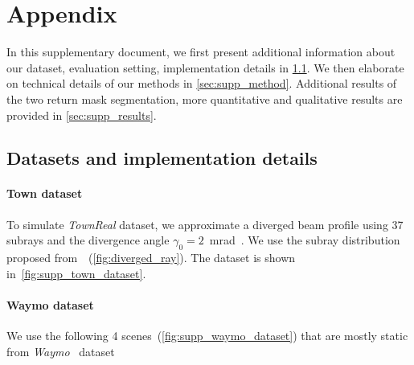 \section{Appendix}
In this supplementary document, we first present additional information about our dataset, evaluation setting, implementation details in \cref{sec:supp_data}. We then elaborate on technical details of our methods in \cref{sec:supp_method}. Additional results of the two return mask segmentation, more quantitative and qualitative results are provided in \cref{sec:supp_results}.

\subsection{Datasets and implementation details}
\label{sec:supp_data}
\paragraph{Town dataset}
To simulate \textit{TownReal} dataset, we approximate a diverged beam profile using 37 subrays and the divergence angle $\gamma_0 = 2 $~mrad~\cite{glennie2012calibration}. We use the subray distribution proposed from~\cite{winiwarter2022virtual}~(\cf \cref{fig:diverged_ray}). The dataset is shown in~\cref{fig:supp_town_dataset}. 

\paragraph{Waymo dataset}
We use the following 4 scenes~(\cf \cref{fig:supp_waymo_dataset}) that are mostly static from \textit{Waymo}~\cite{sun2020scalability} dataset 


\begin{table}[!h]
    \setlength{\tabcolsep}{6pt}
    \renewcommand{\arraystretch}{1.2}
	\centering
\end{table}

